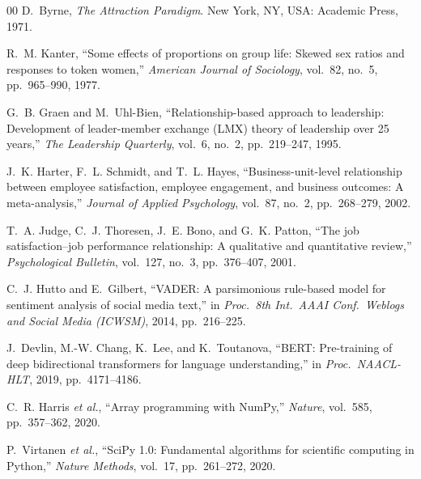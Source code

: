 \documentclass[conference]{IEEEtran}
\begin{document}
\begin{thebibliography}{00}
 D.~Byrne, \emph{The Attraction Paradigm}. New York, NY, USA:
Academic Press, 1971.

 R.~M. Kanter, ``Some effects of proportions on group life:
Skewed sex ratios and responses to token women,'' \emph{American Journal of
Sociology}, vol.~82, no.~5, pp.~965--990, 1977.

 G.~B. Graen and M.~Uhl-Bien, ``Relationship-based approach to
leadership: Development of leader-member exchange (LMX) theory of leadership over
25 years,'' \emph{The Leadership Quarterly}, vol.~6, no.~2, pp.~219--247, 1995.

 J.~K. Harter, F.~L. Schmidt, and T.~L. Hayes,
``Business-unit-level relationship between employee satisfaction, employee
engagement, and business outcomes: A meta-analysis,'' \emph{Journal of Applied
Psychology}, vol.~87, no.~2, pp.~268--279, 2002.

 T.~A. Judge, C.~J. Thoresen, J.~E. Bono, and G.~K. Patton,
``The job satisfaction--job performance relationship: A qualitative and
quantitative review,'' \emph{Psychological Bulletin}, vol.~127, no.~3,
pp.~376--407, 2001.

 C.~J. Hutto and E.~Gilbert, ``VADER: A parsimonious rule-based
model for sentiment analysis of social media text,'' in \emph{Proc.\ 8th Int.\
AAAI Conf.\ Weblogs and Social Media (ICWSM)}, 2014, pp.~216--225.

 J.~Devlin, M.-W. Chang, K.~Lee, and K.~Toutanova, ``BERT:
Pre-training of deep bidirectional transformers for language understanding,'' in
\emph{Proc.\ NAACL-HLT}, 2019, pp.~4171--4186.

 C.~R. Harris \emph{et al.}, ``Array programming with NumPy,''
\emph{Nature}, vol.~585, pp.~357--362, 2020.

 P.~Virtanen \emph{et al.}, ``SciPy 1.0: Fundamental
algorithms for scientific computing in Python,'' \emph{Nature Methods}, vol.~17,
pp.~261--272, 2020.

\end{thebibliography}
\end{document}
